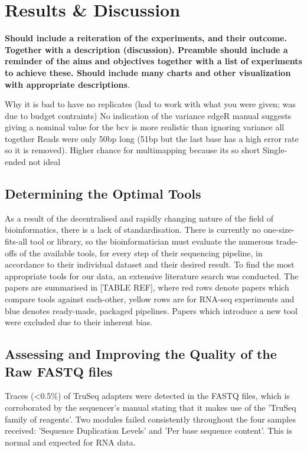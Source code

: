 \chapter{Results \& Discussion}

\textbf{Should include a reiteration of the experiments, and their outcome.  Together with a description (discussion).  Preamble should include a reminder of the aims and objectives together with a list of experiments to achieve these.  Should include many charts and other visualization with appropriate descriptions}.  


Why it is bad to have no replicates (had to work with what you were given; was due to budget contraints)
No indication of the variance
edgeR manual suggests giving a nominal value for the bcv is more realistic than ignoring variance all together
Reads were only 50bp long (51bp but the last base has a high error rate so it is removed). Higher chance for multimapping because its so short
Single-ended not ideal



\section{Determining the Optimal Tools}
As a result of the decentralised and rapidly changing nature of the field of bioinformatics, there is a lack of standardisation. There is currently no one-size-fits-all tool or library, so the bioinformatician must evaluate the numerous trade-offs of the available tools, for every step of their sequencing pipeline, in accordance to their individual dataset and their desired result. To find the most appropriate tools for our data, an extensive literature search was conducted. The papers are summarised in [TABLE REF], where red rows denote papers which compare tools against each-other, yellow rows are for RNA-seq experiments and blue denotes ready-made, packaged pipelines. Papers which introduce a new tool were excluded due to their inherent bias.





\section{Assessing and Improving the Quality of the Raw FASTQ files}
\label{Assessing the Quality of the Raw FASTQ files}
Traces (<0.5\%) of TruSeq adapters were detected in the FASTQ files, which is corroborated by the sequencer's manual \citep{HiSeq2000} stating that it makes use of the 'TruSeq family of reagents'. 
Two modules failed consistently throughout the four samples received: 'Sequence Duplication Levels' and 'Per base sequence content'. This is normal and expected for RNA data.




